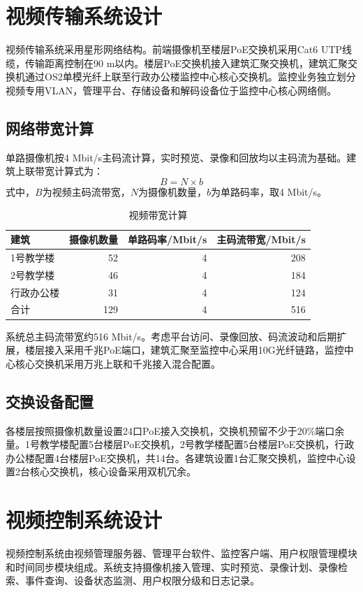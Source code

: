 \documentclass[UTF8,zihao=-4,openany]{ctexrep}
\begin{document}
\section{视频传输系统设计}
视频传输系统采用星形网络结构。前端摄像机至楼层PoE交换机采用Cat6 UTP线缆，传输距离控制在90 m以内。楼层PoE交换机接入建筑汇聚交换机，建筑汇聚交换机通过OS2单模光纤上联至行政办公楼监控中心核心交换机。监控业务独立划分视频专用VLAN，管理平台、存储设备和解码设备位于监控中心核心网络侧。

\subsection{网络带宽计算}
单路摄像机按4 Mbit/s主码流计算，实时预览、录像和回放均以主码流为基础。建筑上联带宽计算式为：
\begin{equation}
  B=N\times b
\end{equation}
式中，$B$为视频主码流带宽，$N$为摄像机数量，$b$为单路码率，取4 Mbit/s。

\begin{table}[H]
\centering
\caption{视频带宽计算}
\begin{tabular}{lrrr}
\toprule
建筑&摄像机数量&单路码率/Mbit/s&主码流带宽/Mbit/s\\
\midrule
1号教学楼&52&4&208\\
2号教学楼&46&4&184\\
行政办公楼&31&4&124\\
\midrule
合计&129&4&516\\
\bottomrule
\end{tabular}
\end{table}

系统总主码流带宽约516 Mbit/s。考虑平台访问、录像回放、码流波动和后期扩展，楼层接入采用千兆PoE端口，建筑汇聚至监控中心采用10G光纤链路，监控中心核心交换机采用万兆上联和千兆接入混合配置。

\subsection{交换设备配置}
各楼层按照摄像机数量设置24口PoE接入交换机，交换机预留不少于20\%端口余量。1号教学楼配置5台楼层PoE交换机，2号教学楼配置5台楼层PoE交换机，行政办公楼配置4台楼层PoE交换机，共14台。各建筑设置1台汇聚交换机，监控中心设置2台核心交换机，核心设备采用双机冗余。

\section{视频控制系统设计}
视频控制系统由视频管理服务器、管理平台软件、监控客户端、用户权限管理模块和时间同步模块组成。系统支持摄像机接入管理、实时预览、录像计划、录像检索、事件查询、设备状态监测、用户权限分级和日志记录。
\end{document}
